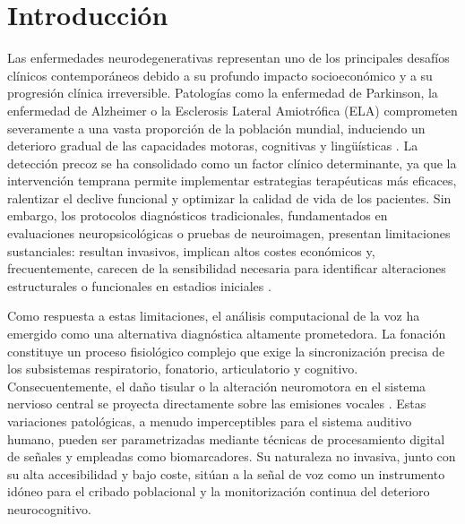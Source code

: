 
\section{Introducción}\label{sec:intro_estado_arte}

Las enfermedades neurodegenerativas representan uno de los principales desafíos clínicos contemporáneos debido a su profundo impacto socioeconómico y a su progresión clínica irreversible. Patologías como la enfermedad de Parkinson, la enfermedad de Alzheimer o la Esclerosis Lateral Amiotrófica (ELA) comprometen severamente a una vasta proporción de la población mundial, induciendo un deterioro gradual de las capacidades motoras, cognitivas y lingüísticas \cite{abrilcarreres2024}. La detección precoz se ha consolidado como un factor clínico determinante, ya que la intervención temprana permite implementar estrategias terapéuticas más eficaces, ralentizar el declive funcional y optimizar la calidad de vida de los pacientes. Sin embargo, los protocolos diagnósticos tradicionales, fundamentados en evaluaciones neuropsicológicas o pruebas de neuroimagen, presentan limitaciones sustanciales: resultan invasivos, implican altos costes económicos y, frecuentemente, carecen de la sensibilidad necesaria para identificar alteraciones estructurales o funcionales en estadios iniciales \cite{avance2023}.

Como respuesta a estas limitaciones, el análisis computacional de la voz ha emergido como una alternativa diagnóstica altamente prometedora. La fonación constituye un proceso fisiológico complejo que exige la sincronización precisa de los subsistemas respiratorio, fonatorio, articulatorio y cognitivo. Consecuentemente, el daño tisular o la alteración neuromotora en el sistema nervioso central se proyecta directamente sobre las emisiones vocales \cite{romero2018}. Estas variaciones patológicas, a menudo imperceptibles para el sistema auditivo humano, pueden ser parametrizadas mediante técnicas de procesamiento digital de señales y empleadas como biomarcadores. Su naturaleza no invasiva, junto con su alta accesibilidad y bajo coste, sitúan a la señal de voz como un instrumento idóneo para el cribado poblacional y la monitorización continua del deterioro neurocognitivo.

